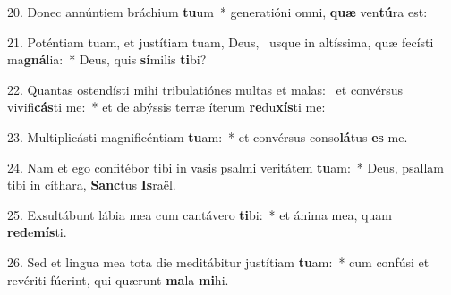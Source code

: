 20. Donec annúntiem bráchium \textbf{tu}um~*  generatióni omni, \textbf{quæ} ven\textbf{tú}ra est:\

21. Poténtiam tuam, et justítiam tuam, Deus, \dag\  usque in altíssima, quæ fecísti ma\textbf{gná}lia:~*  Deus, quis \textbf{sí}milis \textbf{ti}bi?\

22. Quantas ostendísti mihi tribulatiónes multas et malas: \dag\  et convérsus vivifi\textbf{cás}ti me:~*  et de abýssis terræ íterum \textbf{re}du\textbf{xís}ti me:\

23. Multiplicásti magnificéntiam \textbf{tu}am:~*  et convérsus conso\textbf{lá}tus \textbf{es} me.\

24. Nam et ego confitébor tibi in vasis psalmi veritátem \textbf{tu}am:~*  Deus, psallam tibi in cíthara, \textbf{Sanc}tus \textbf{Is}raël.\

25. Exsultábunt lábia mea cum cantávero \textbf{ti}bi:~*  et ánima mea, quam \textbf{red}e\textbf{mís}ti.\

26. Sed et lingua mea tota die meditábitur justítiam \textbf{tu}am:~*  cum confúsi et revériti fúerint, qui quærunt \textbf{ma}la \textbf{mi}hi.\

